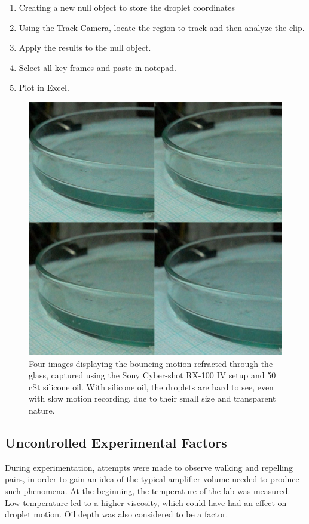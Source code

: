 \begin{enumerate}
\item  Creating a new null object to store the droplet coordinates
\item  Using the Track Camera, locate the region to track and then analyze  the clip.
\item  Apply the results to the null object.
\item  Select all key frames and paste in notepad.
\item  Plot in Excel.
\end{enumerate}

\begin{figure}[ht]
\includegraphics[width=\textwidth]{prototype/exp_rep_imgs/bouncing_refr_glass.jpg}
\centering
\caption{Four images displaying the bouncing motion refracted through the glass, captured using the Sony Cyber-shot RX-100 IV setup and 50 cSt silicone oil. With silicone oil, the droplets are hard to see, even with slow motion recording, due to their small size and transparent nature.}
\centering
\label{fig:bouncing_refr_glass}
\end{figure}

\subsection{Uncontrolled Experimental Factors}
During experimentation, attempts were made to observe walking and repelling pairs, in order to gain an idea of the typical amplifier volume needed to produce such phenomena. At the beginning, the temperature of the lab was measured. Low temperature led to a higher viscosity, which could have had an effect on droplet motion. Oil depth was also considered to be a factor.

